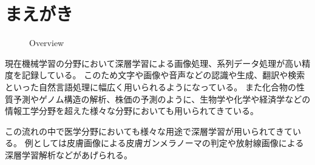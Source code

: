 \section{まえがき}

\begin{figure}[b]
    \centering
         \quad
         \quad
    \captionsetup{format=plain,font=normalsize,margin=30pt,name=図}
    \caption[]{Overview}
    \label{fig:overview}
\end{figure}

現在機械学習の分野において深層学習による画像処理\cite{CNN,AlexNet,VGG,ResNet}、系列データ処理\cite{RNN,GRU,LSTM,Transformer}が高い精度を記録している。
このため文字や画像や音声などの認識\cite{DL_LVCSR,ImageNet}や生成\cite{GAN,VAE}、翻訳\cite{Transformer,Seq2Seq,effective_attention}や検索\cite{anxious_learning}といった自然言語処理に幅広く用いられるようになっている。
また化合物の性質予測\cite{Chemistry1,Chemistry2}やゲノム構造の解析\cite{Genomics}、株価の予測\cite{stock_prediction}のように、生物学や化学や経済学などの情報工学分野を超えた様々な分野においても用いられてきている。

この流れの中で医学分野においても様々な用途で深層学習が用いられてきている。
例としては皮膚画像による皮膚ガンメラノーマの判定\cite{skin_cancer_melanoma}や放射線画像による深層学習解析\cite{radiology}などがあげられる。

